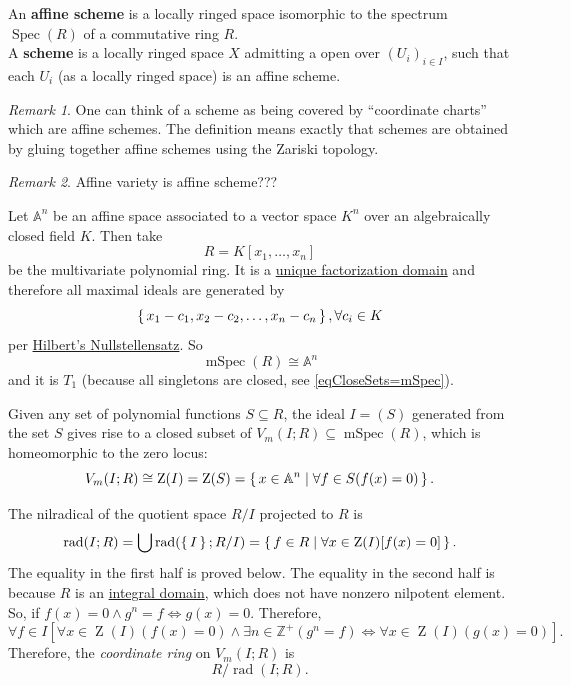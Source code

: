 \documentclass[12pt, letterpaper]{article}
\newcommand{\inte}{\mathbb{Z}}
\newcommand{\ZZ}{\operatorname{Z}}
\newcommand{\red}[1]{{\color{red} #1}}
\theoremstyle{definition}
\theoremstyle{remark}
\newtheorem*{rem*}{Remark}
\theoremstyle{definition}
\theoremstyle{plain}
\numberwithin{equation}{section}
\begin{document}
	\begin{def*}
		An \textbf{affine scheme} is a locally ringed space isomorphic to the spectrum $\operatorname{Spec}(R)$
		of a commutative ring $R$.\\
		A \textbf{scheme} is a locally ringed space $X$ admitting a open over $(U_i)_{i\in I}$, such that each $U_i$
		(as a locally ringed space) is an affine scheme.
	\end{def*}
	\begin{rem*}
		One can think of a scheme as being covered by ``coordinate charts'' which are affine schemes.
		The definition means exactly that schemes are obtained by gluing together affine schemes using the Zariski topology.
	\end{rem*}
	\begin{rem*}
		\red{Affine variety is affine scheme???}
		
		Let $\mathbb{A}^n$ be an affine space associated to a vector space $K^n$ over an algebraically closed field $K$.
		Then take \[R=K[x_1,\dots,x_n]\] be the multivariate polynomial ring. It is a 
		\href{https://en.wikipedia.org/wiki/Polynomial_ring#Properties_that_pass_from_R_to_R[X]}{unique factorization domain}
		and therefore all maximal ideals are generated by \[\set{x_1-c_1,x_2-c_2,\dots,x_n-c_n}, \forall c_i\in K\] per 
		\href{https://en.wikipedia.org/wiki/Hilbert%27s_Nullstellensatz}{Hilbert's Nullstellensatz}.
		So \[\operatorname{mSpec}(R)\cong \mathbb{A}^n\]
		and it is $T_1$ (because all singletons are closed, see \eqref{eqCloseSets=mSpec}).
		
		Given any set of polynomial functions $S\subseteq R$, the ideal $I=(S)$ generated from the set $S$
		gives rise to a closed subset of $V_m(I;R)\subseteq\operatorname{mSpec}(R)$,
		which is homeomorphic to the zero locus:
		\[V_m(I;R)
		\cong \ZZ(I)=\ZZ(S)=\set{x\in \mathbb{A}^n| \forall f\in S(f(x)=0)}.\]
		
		The nilradical of the quotient space $R/I$ projected to $R$ is
		\[\operatorname{rad}(I;R)= \bigcup \operatorname{rad}(\set{I};R/I)=\set{ f\in R|\forall x\in\ZZ(I)[ f(x)=0] }. \]
		The equality in the first half is proved below.
		The equality in the second half is because $R$ is an 
		\href{https://en.wikipedia.org/wiki/Polynomial_ring#Properties_that_pass_from_R_to_R[X]}
		{integral domain}, which does not have nonzero nilpotent element.
		So, if $f(x)=0\land g^n=f \iff g(x)=0$. Therefore,
		\[ \forall f \in I [\forall x \in \ZZ(I)(f(x)=0)\land \exists n\in\inte^+ (g^n=f) \iff \forall x \in \ZZ(I)(g(x)=0)]. \]
		Therefore, the \textit{coordinate ring} on $V_m(I;R)$ is \[R/\operatorname{rad}(I;R).\]
		

\end{rem*}
\end{document}
